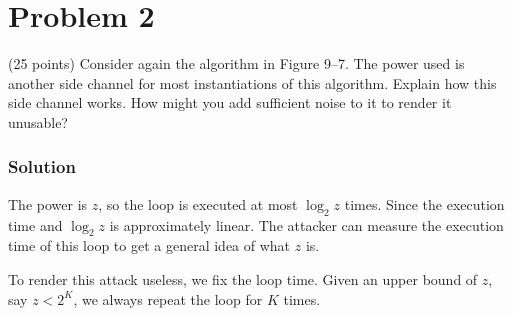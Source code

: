 \section*{Problem 2}
(25 points) Consider again the algorithm in Figure 9–7. 
The power used is another side channel for most instantiations of this algorithm. 
Explain how this side channel works. 
How might you add sufficient noise to it to render it unusable?

\subsubsection*{Solution}

The power is $z$, so the loop is executed at most $\log_2 z$ times. 
Since the execution time and $\log_2 z$ is approximately linear.
The attacker can measure the execution time of this loop to get a general idea of what $z$ is.

To render this attack useless, we fix the loop time.
Given an upper bound of $z$, say $z < 2^K$, we always repeat the loop for $K$ times.
